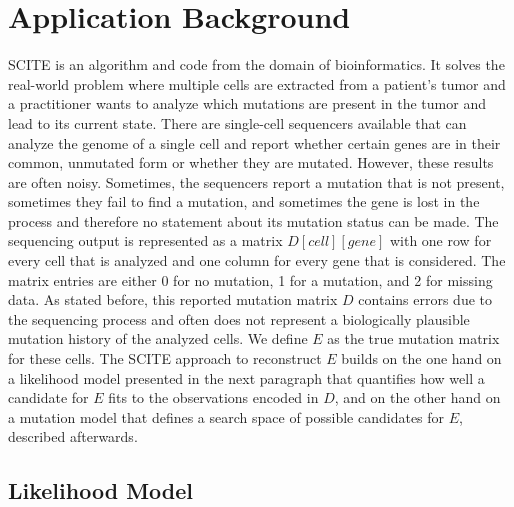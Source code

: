 \section{Application Background}
\label{sec:introduction}

\ac{SCITE} \cite{tree2016} is an algorithm and code from the domain of bioinformatics. It solves the real-world problem where multiple cells are extracted from a patient's tumor and a practitioner wants to analyze which mutations are present in the tumor and lead to its current state. There are single-cell sequencers available that can analyze the genome of a single cell and report whether certain genes are in their common, unmutated form or whether they are mutated. However, these results are often noisy. Sometimes, the sequencers report a mutation that is not present, sometimes they fail to find a mutation, and sometimes the gene is lost in the process and therefore no statement about its mutation status can be made. The sequencing output is represented as a matrix $D[cell][gene]$ with one row for every cell that is analyzed and one column for every gene that is considered. The matrix entries are either 0 for no mutation, 1 for a mutation, and 2 for missing data. As stated before, this reported mutation matrix $D$ contains errors due to the sequencing process and often does not represent a biologically plausible mutation history of the analyzed cells. We define $E$ as the true mutation matrix for these cells.
The \ac{SCITE} approach to reconstruct $E$ builds on the one hand on a likelihood model presented in the next paragraph that quantifies how well a candidate for $E$ fits to the observations encoded in $D$, and on the other hand on a mutation model that defines a search space of possible candidates for $E$, described afterwards.

\subsection{Likelihood Model}

